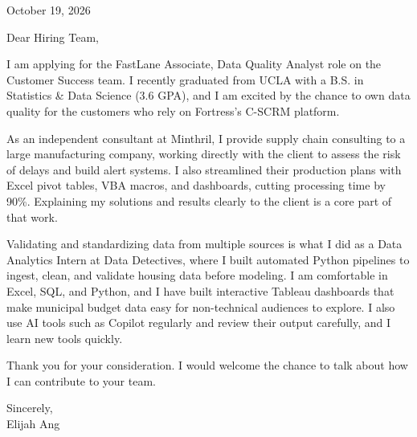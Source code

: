 \documentclass[11pt,letterpaper]{article}
\begin{document}


\vspace{12pt}

October 19, 2026

Dear Hiring Team,

I am applying for the FastLane Associate, Data Quality Analyst role on the Customer Success team. I recently graduated from UCLA with a B.S. in Statistics \& Data Science (3.6 GPA), and I am excited by the chance to own data quality for the customers who rely on Fortress's C-SCRM platform.

As an independent consultant at Minthril, I provide supply chain consulting to a large manufacturing company, working directly with the client to assess the risk of delays and build alert systems. I also streamlined their production plans with Excel pivot tables, VBA macros, and dashboards, cutting processing time by 90\%. Explaining my solutions and results clearly to the client is a core part of that work.

Validating and standardizing data from multiple sources is what I did as a Data Analytics Intern at Data Detectives, where I built automated Python pipelines to ingest, clean, and validate housing data before modeling. I am comfortable in Excel, SQL, and Python, and I have built interactive Tableau dashboards that make municipal budget data easy for non-technical audiences to explore. I also use AI tools such as Copilot regularly and review their output carefully, and I learn new tools quickly.

Thank you for your consideration. I would welcome the chance to talk about how I can contribute to your team.

Sincerely,\\
Elijah Ang
\end{document}
